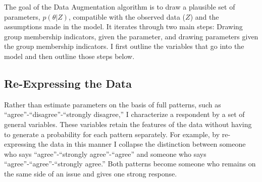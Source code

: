 \documentclass[12pt,]{article}
\begin{document}
The goal of the Data Augmentation algorithm is to draw a plausible set of parameters, \(p(\theta|Z)\), compatible with the observed data (\(Z\)) and the assumptions made in the model. It iterates through two main steps: Drawing group membership indicators, given the parameter, and drawing parameters given the group membership indicators. I first outline the variables that go into the model and then outline those steps below.

\hypertarget{re-expressing-the-data}{%
\subsection{Re-Expressing the Data}\label{re-expressing-the-data}}

Rather than estimate parameters on the basis of full patterns, such as ``agree''-``disagree''-``strongly disagree,'' I characterize a respondent by a set of general variables. These variables retain the features of the data without having to generate a probability for each pattern separately. For example, by re-expressing the data in this manner I collapse the distinction between someone who says ``agree''-``strongly agree''-``agree'' and someone who says ``agree''-``agree''-``strongly agree.'' Both patterns become someone who remains on the same side of an issue and gives one strong response.
\end{document}
